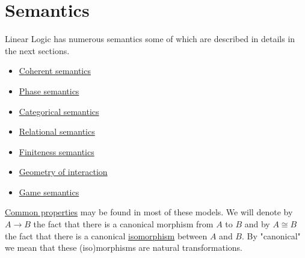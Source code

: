 \section{Semantics}\label{semantics}

Linear Logic has numerous semantics some of which are described in
details in the next sections.

\begin{itemize}
\tightlist
\item
  \href{Coherent_semantics}{Coherent semantics}
\item
  \href{Phase_semantics}{Phase semantics}
\item
  \href{Categorical_semantics}{Categorical semantics}
\item
  \href{Relational_semantics}{Relational semantics}
\item
  \href{Finiteness_semantics}{Finiteness semantics}
\item
  \href{Geometry_of_interaction}{Geometry of interaction}
\item
  \href{Game_semantics}{Game semantics}
\end{itemize}

\href{Provable_formulas}{Common properties} may be found in most of
these models. We will denote by \(A\longrightarrow B\) the fact that
there is a canonical morphism from \(A\) to \(B\) and by \(A\cong B\)
the fact that there is a canonical \url{isomorphism} between \(A\) and
\(B\). By "canonical" we mean that these (iso)morphisms are natural
transformations.


